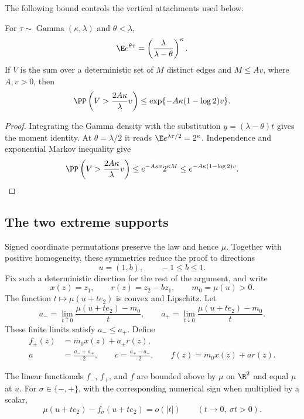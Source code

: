 The following bound controls the vertical attachments used below.

\begin{lemma}\label{df:ga:moment}
For $\tau\sim\operatorname{Gamma}(\kappa,\lambda)$ and $\theta<\lambda$,
\[
 \E e^{\theta\tau}
 =\left(\frac{\lambda}{\lambda-\theta}\right)^\kappa.
\]
If $V$ is the sum over a deterministic set of $M$ distinct edges and
$M\le A v$, where $A,v>0$, then
\begin{equation}\label{df:eq:gamma-sum-tail}
 \PP\left(V>\frac{2A\kappa}{\lambda}v\right)
 \le \exp\{-A\kappa(1-\log 2)v\}.
\end{equation}
\end{lemma}

\begin{proof}
Integrating the Gamma density with the substitution
$y=(\lambda-\theta)t$ gives the moment identity. At
$\theta=\lambda/2$ it reads $\E e^{\lambda\tau/2}=2^\kappa$.
Independence and exponential Markov inequality give
\[
 \PP\left(V>\frac{2A\kappa}{\lambda}v\right)
 \le e^{-A\kappa v}2^{\kappa M}
 \le e^{-A\kappa(1-\log 2)v}.
\]
\end{proof}

\subsection{The two extreme supports}

Signed coordinate permutations preserve the law and hence $\mu$.
Together with positive homogeneity, these symmetries reduce the proof
to directions
\[
 u=(1,b),\qquad -1\le b\le1.
\]
Fix such a deterministic direction for the rest of the argument, and
write
\[
 x(z)=z_1,\qquad r(z)=z_2-bz_1,
 \qquad m_0=\mu(u)>0.
\]
The function $t\mapsto\mu(u+te_2)$ is convex and Lipschitz. Let
\[
 a_- = \lim_{t\uparrow0}\frac{\mu(u+te_2)-m_0}{t},
 \qquad
 a_+ = \lim_{t\downarrow0}\frac{\mu(u+te_2)-m_0}{t}.
\]
These finite limits satisfy $a_-\le a_+$. Define
\begin{equation}\label{df:eq:support-definitions}
 \begin{split}
 f_\pm(z)&=m_0x(z)+a_\pm r(z),\\
 a&=\frac{a_-+a_+}{2},\qquad
 c=\frac{a_+-a_-}{2},\qquad
 f(z)=m_0x(z)+ar(z).
 \end{split}
\end{equation}

\begin{lemma}\label{df:prelim:supports}
The linear functionals $f_-$, $f_+$, and $f$ are bounded above by
$\mu$ on $\R^2$ and equal $\mu$ at $u$. For
$\sigma\in\{-,+\}$, with the corresponding numerical sign when
multiplied by a scalar,
\begin{equation}\label{df:eq:support-contact}
 \mu(u+te_2)-f_\sigma(u+te_2)=o(|t|)
 \qquad(t\to0,\ \sigma t>0).
\end{equation}
\end{lemma}

